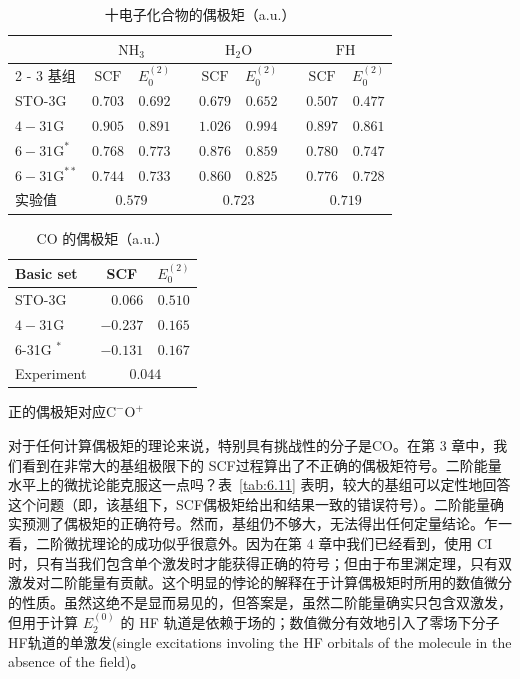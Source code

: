 \begin{table}
	\centering
	\caption{十电子化合物的偶极矩（a.u.）}
	\begin{tabular}{lcccccccc}
		\hline & \multicolumn{2}{c}{$\mathrm{NH}_3$} & & \multicolumn{2}{c}{$\mathrm{H}_2 \mathrm{O}$} & & \multicolumn{2}{c}{$\mathrm{FH}$} \\
		\cline { 2 - 3 } \cline { 8 - 9 } \cline { 8 - 9 } 基组 & $\mathrm{SCF}$ & $E_0^{(2)}$ & & $\mathrm{SCF}$ & $E_0^{(2)}$ & & $\mathrm{SCF}$ & $E_0^{(2)}$ \\
		\hline STO-3G & $0.703$ & $0.692$ & & $0.679$ & $0.652$ & & $0.507$ & $0.477$ \\
		$4-31 \mathrm{G}$ & $0.905$ & $0.891$ & & $1.026$ & $0.994$ & & $0.897$ & $0.861$ \\
		$6-31 \mathrm{G}^*$ & $0.768$ & $0.773$ & & $0.876$ & $0.859$ & & $0.780$ & $0.747$ \\
		$6-31 \mathrm{G}^{* *}$ & $0.744$ & $0.733$ & & $0.860$ & $0.825$ & & $0.776$ & $0.728$ \\
		实验值 & \multicolumn{2}{c}{$0.579$} & & \multicolumn{2}{c}{$0.723$} & & \multicolumn{2}{c}{$0.719$} \\
		\hline
	\end{tabular}
	\label{tab:6.10}
\end{table}

\begin{table}
	\centering
	\caption{CO 的偶极矩（a.u.）}
	\begin{threeparttable}
		\begin{tabular}{lrc}
			\hline Basic set & \multicolumn{1}{c}{ SCF } & $E_0^{(2)}$ \\
			\hline STO-3G & $0.066$ & $0.510$ \\
			$4-31 \mathrm{G}$ & $-0.237$ & $0.165$ \\
			6-31G $^*$ & $-0.131$ & $0.167$ \\
			Experiment & \multicolumn{2}{c}{$0.044$} \\
			\hline
		\end{tabular}
		\begin{tablenotes}
			\item[a] 正的偶极矩对应$\mathrm{C^-O^+}$
		\end{tablenotes}
	\end{threeparttable}
	\label{tab:6.11}
\end{table}

对于任何计算偶极矩的理论来说，特别具有挑战性的分子是CO。在第 3 章中，我们看到在非常大的基组极限下的 SCF过程算出了不正确的偶极矩符号。二阶能量水平上的微扰论能克服这一点吗？表~\autoref{tab:6.11} 表明，较大的基组可以定性地回答这个问题（即，该基组下，SCF偶极矩给出和结果一致的错误符号）。二阶能量确实预测了偶极矩的正确符号。然而，基组仍不够大，无法得出任何定量结论。乍一看，二阶微扰理论的成功似乎很意外。因为在第 4 章中我们已经看到，使用 CI时，只有当我们包含单个激发时才能获得正确的符号；但由于布里渊定理，只有双激发对二阶能量有贡献。这个明显的悖论的解释在于计算偶极矩时所用的数值微分的性质。虽然这绝不是显而易见的，但答案是，虽然二阶能量确实只包含双激发，但用于计算 $E_2^{(0)}$ 的 HF 轨道是依赖于场的；数值微分有效地引入了零场下分子HF轨道的单激发(single excitations involing the HF orbitals of the molecule in the absence of the field)。

